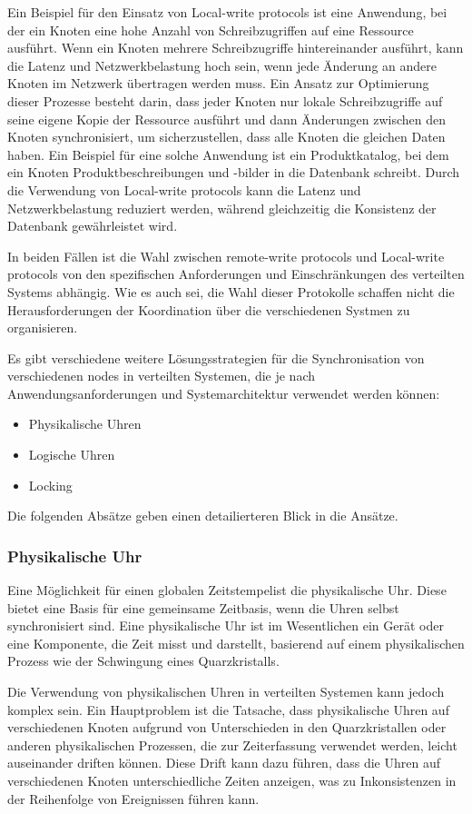 Ein Beispiel für den Einsatz von Local-write protocols ist eine Anwendung, bei der ein Knoten eine hohe Anzahl von Schreibzugriffen auf eine Ressource ausführt. Wenn ein Knoten mehrere Schreibzugriffe hintereinander ausführt, kann die Latenz und Netzwerkbelastung hoch sein, wenn jede Änderung an andere Knoten im Netzwerk übertragen werden muss. Ein Ansatz zur Optimierung dieser Prozesse besteht darin, dass jeder Knoten nur lokale Schreibzugriffe auf seine eigene Kopie der Ressource ausführt und dann Änderungen zwischen den Knoten synchronisiert, um sicherzustellen, dass alle Knoten die gleichen Daten haben. Ein Beispiel für eine solche Anwendung ist ein Produktkatalog, bei dem ein Knoten Produktbeschreibungen und -bilder in die Datenbank schreibt. Durch die Verwendung von Local-write protocols kann die Latenz und Netzwerkbelastung reduziert werden, während gleichzeitig die Konsistenz der Datenbank gewährleistet wird.

In beiden Fällen ist die Wahl zwischen remote-write protocols und Local-write protocols von den spezifischen Anforderungen und Einschränkungen des verteilten Systems abhängig. Wie es auch sei, die Wahl dieser Protokolle schaffen nicht die Herausforderungen der Koordination über die verschiedenen Systmen zu organisieren. 

Es gibt verschiedene weitere Lösungsstrategien für die Synchronisation von verschiedenen nodes in verteilten Systemen, die je nach Anwendungsanforderungen und Systemarchitektur verwendet werden können:
\begin{itemize}
\item Physikalische Uhren
\item Logische Uhren
\item Locking
\end{itemize}
Die folgenden Absätze geben einen detailierteren Blick in die Ansätze. 

\subsubsection{Physikalische Uhr}

Eine Möglichkeit für einen globalen Zeitstempelist die physikalische Uhr. Diese bietet eine Basis für eine gemeinsame Zeitbasis, wenn die Uhren selbst synchronisiert sind. Eine physikalische Uhr ist im Wesentlichen ein Gerät oder eine Komponente, die Zeit misst und darstellt, basierend auf einem physikalischen Prozess wie der Schwingung eines Quarzkristalls.

Die Verwendung von physikalischen Uhren in verteilten Systemen kann jedoch komplex sein. Ein Hauptproblem ist die Tatsache, dass physikalische Uhren auf verschiedenen Knoten aufgrund von Unterschieden in den Quarzkristallen oder anderen physikalischen Prozessen, die zur Zeiterfassung verwendet werden, leicht auseinander driften können. Diese Drift kann dazu führen, dass die Uhren auf verschiedenen Knoten unterschiedliche Zeiten anzeigen, was zu Inkonsistenzen in der Reihenfolge von Ereignissen führen kann.

